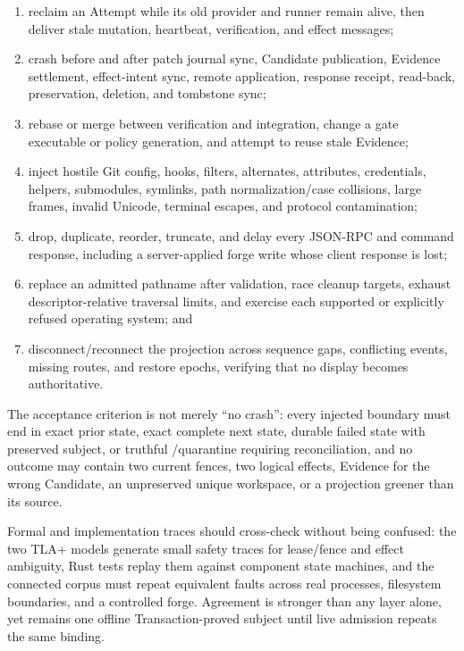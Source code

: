 \documentclass[journal]{IEEEtran}
\newcommand{\TransactionProved}{\textsf{Transaction-proved}}
\newcommand{\code}[1]{\texttt{\detokenize{#1}}}
\begin{document}
{\small
\begin{enumerate}
\item reclaim an Attempt while its old provider and runner remain alive, then
deliver stale mutation, heartbeat, verification, and effect messages;
\item crash before and after patch journal sync, Candidate publication,
Evidence settlement, effect-intent sync, remote application, response receipt,
read-back, preservation, deletion, and tombstone sync;
\item rebase or merge between verification and integration, change a gate
executable or policy generation, and attempt to reuse stale Evidence;
\item inject hostile Git config, hooks, filters, alternates, attributes,
credentials, helpers, submodules, symlinks, path normalization/case collisions,
large frames, invalid Unicode, terminal escapes, and protocol contamination;
\item drop, duplicate, reorder, truncate, and delay every JSON-RPC and command
response, including a server-applied forge write whose client response is lost;
\item replace an admitted pathname after validation, race cleanup targets,
exhaust descriptor-relative traversal limits, and exercise each supported or
explicitly refused operating system; and
\item disconnect/reconnect the projection across sequence gaps, conflicting
events, missing routes, and restore epochs, verifying that no display becomes
authoritative.
\end{enumerate}
}

The acceptance criterion is not merely ``no crash'': every injected boundary
must end in exact prior state, exact complete next state, durable failed state
with preserved subject, or truthful \code{UNKNOWN}/quarantine requiring
reconciliation, and no outcome may contain two current fences, two logical
effects, Evidence for the wrong Candidate, an unpreserved unique workspace, or
a projection greener than its source.

Formal and implementation traces should cross-check without being confused:
the two TLA+ models generate small safety traces for lease/fence and effect
ambiguity, Rust tests replay them against component state machines, and the
connected corpus must repeat equivalent faults across real processes,
filesystem boundaries, and a controlled forge. Agreement is stronger than any
layer alone, yet remains one offline \TransactionProved{} subject until live
admission repeats the same binding.
\end{document}
